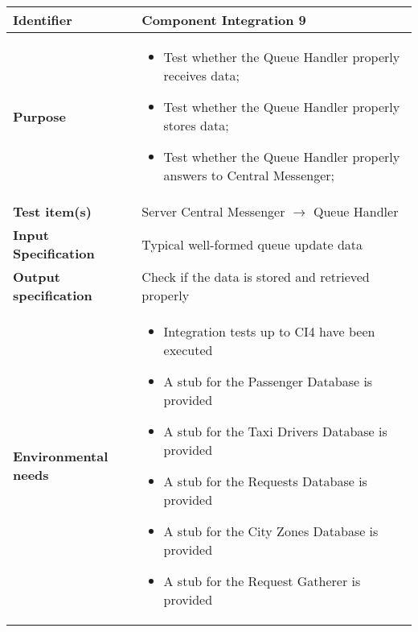 \begin{center}
\begin{tabular}{lp{}}
\toprule
\textbf{Identifier}		&	Component Integration 9\\
\midrule
\textbf{Purpose}		&	\begin{itemize}
					\item Test whether the Queue Handler properly receives data;
					\item Test whether the Queue Handler properly stores data; 
					\item Test whether the Queue Handler properly answers to Central Messenger;
					\end{itemize}	\\
\textbf{Test item(s)}	&	Server Central Messenger $\rightarrow$ Queue Handler\\
\textbf{Input Specification}	&	Typical well-formed queue update data\\
\textbf{Output specification}	&	Check if the data is stored and retrieved properly\\
\textbf{Environmental needs}	&	\begin{itemize}
							\item Integration tests up to CI4 have been executed
							\item A stub for the Passenger Database is provided
							\item A stub for the Taxi Drivers Database is provided
							\item A stub for the Requests Database is provided
							\item A stub for the City Zones Database is provided
							\item A stub for the Request Gatherer is provided
							\end{itemize}	\\
\bottomrule
\end{tabular}
\end{center}




